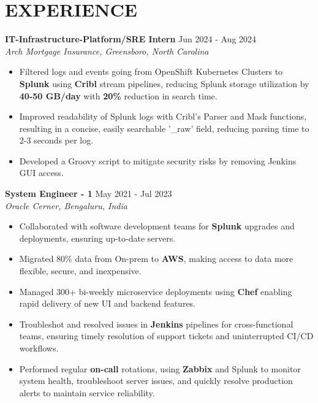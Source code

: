 \documentclass[a4paper,9pt]{extarticle}
\begin{document}
\section*{EXPERIENCE}
\noindent
\textbf{IT-Infrastructure-Platform/SRE Intern}
\hfill Jun 2024 - Aug 2024\\ %
\textit{Arch Mortgage Insurance, Greensboro, North Carolina}
\begin{itemize}
    \item Filtered logs and events going from OpenShift Kubernetes Clusters to \textbf{Splunk} using \textbf{Cribl} stream pipelines, reducing Splunk storage utilization by \textbf{40-50 GB/day} with \textbf{20\%} reduction in search time.
    \item Improved readability of Splunk logs with Cribl's Parser and Mask functions, resulting in a concise, easily searchable '\_raw' field, reducing parsing time to 2-3 seconds per log.
    \item Developed a Groovy script to mitigate security risks by removing Jenkins GUI access.
    

\end{itemize}

\noindent
\textbf{System Engineer - 1}
\hfill May 2021 - Jul 2023\\ %
\textit{Oracle Cerner, Bengaluru, India}
\begin{itemize}
    \item Collaborated with software development teams for \textbf{Splunk} upgrades and deployments, ensuring up-to-date servers.
    \item Migrated 80\% data from On-prem to \textbf{AWS}, making access to data more flexible, secure, and inexpensive.
    \item Managed 300+ bi-weekly microservice deployments using \textbf{Chef} enabling rapid delivery of new UI and backend features.
    \item Troubleshot and resolved issues in \textbf{Jenkins} pipelines for cross-functional teams, ensuring timely resolution of support tickets and uninterrupted CI/CD workflows.
    \item Performed regular \textbf{on-call} rotations, using \textbf{Zabbix} and Splunk to monitor system health, troubleshoot server issues, and quickly resolve production alerts to maintain service reliability.

\end{itemize}
\end{document}
